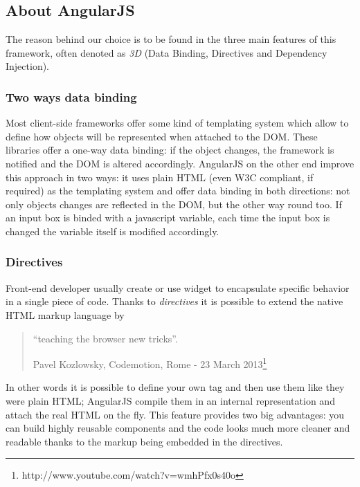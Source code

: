 \documentclass[a4paper,12pt]{report}
\begin{document}
\subsection{About AngularJS}
The reason behind our choice is to be found in the three main features of this framework, often denoted as \emph{3D} (Data Binding, Directives and Dependency Injection).
\subsubsection{Two ways data binding}
Most client-side frameworks offer some kind of templating system which allow to define how objects will be represented when attached to the DOM. These libraries offer a one-way data binding: if the object changes, the framework is notified and the DOM is altered accordingly.
AngularJS on the other end improve this approach in two ways: it uses plain HTML (even W3C compliant, if required) as the templating system and offer data binding in both directions: not only objects changes are reflected in the DOM, but the other way round too. If an input box is binded with a javascript variable, each time the input box is changed the variable itself is modified accordingly.
\subsubsection{Directives}
Front-end developer usually create or use widget to encapsulate specific behavior in a single piece of code. Thanks to \emph{directives} it is possible to extend the native HTML markup language by \begin{quotation}
``teaching the browser new tricks''.
\begin{flushright}
Pavel Kozlowsky, Codemotion, Rome - 23 March 2013\footnote{http://www.youtube.com/watch?v=wmhPfx0s40o}
\end{flushright}
\end{quotation}
In other words it is possible to define your own tag and then use them like they were plain HTML; AngularJS compile them in an internal representation and attach the real HTML on the fly.
This feature provides two big advantages: you can build highly reusable components and the code looks much more cleaner and readable thanks to the markup being embedded in the directives. 
\end{document}
